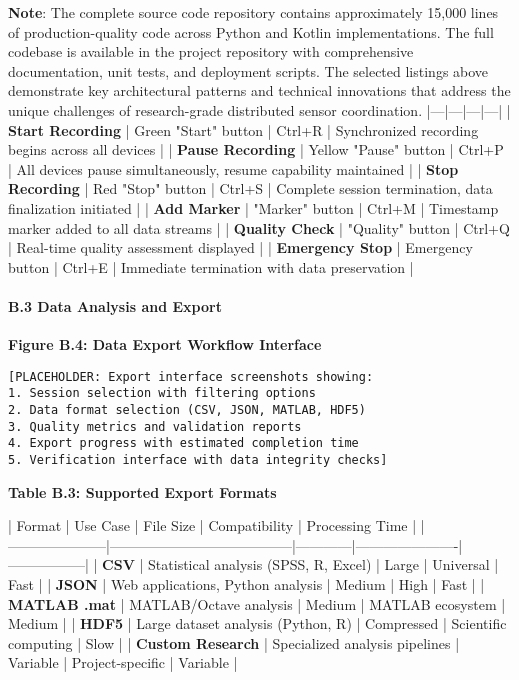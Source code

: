 \documentclass[12pt,a4paper]{report}
\begin{document}
\textbf{Note}: The complete source code repository contains approximately 15,000 lines of production-quality code across
Python and Kotlin implementations. The full codebase is available in the project repository with comprehensive
documentation, unit tests, and deployment scripts. The selected listings above demonstrate key architectural patterns
and technical innovations that address the unique challenges of research-grade distributed sensor coordination.
|---|---|---|---|
| \textbf{Start Recording} | Green "Start" button | Ctrl+R | Synchronized recording begins across all devices |
| \textbf{Pause Recording} | Yellow "Pause" button | Ctrl+P | All devices pause simultaneously, resume capability
maintained |
| \textbf{Stop Recording} | Red "Stop" button | Ctrl+S | Complete session termination, data finalization initiated |
| \textbf{Add Marker} | "Marker" button | Ctrl+M | Timestamp marker added to all data streams |
| \textbf{Quality Check} | "Quality" button | Ctrl+Q | Real-time quality assessment displayed |
| \textbf{Emergency Stop} | Emergency button | Ctrl+E | Immediate termination with data preservation |

\paragraph{B.3 Data Analysis and Export}

\textbf{Figure B.4: Data Export Workflow Interface}

\begin{verbatim}
[PLACEHOLDER: Export interface screenshots showing:
1. Session selection with filtering options
2. Data format selection (CSV, JSON, MATLAB, HDF5)
3. Quality metrics and validation reports
4. Export progress with estimated completion time
5. Verification interface with data integrity checks]
\end{verbatim}

\textbf{Table B.3: Supported Export Formats}

| Format              | Use Case                              | File Size  | Compatibility        | Processing Time |
|---------------------|---------------------------------------|------------|----------------------|-----------------|
| \textbf{CSV}             | Statistical analysis (SPSS, R, Excel) | Large      | Universal            | Fast            |
| \textbf{JSON}            | Web applications, Python analysis     | Medium     | High                 | Fast            |
| \textbf{MATLAB .mat}     | MATLAB/Octave analysis                | Medium     | MATLAB ecosystem     | Medium          |
| \textbf{HDF5}            | Large dataset analysis (Python, R)    | Compressed | Scientific computing | Slow            |
| \textbf{Custom Research} | Specialized analysis pipelines        | Variable   | Project-specific     | Variable        |
\end{document}
